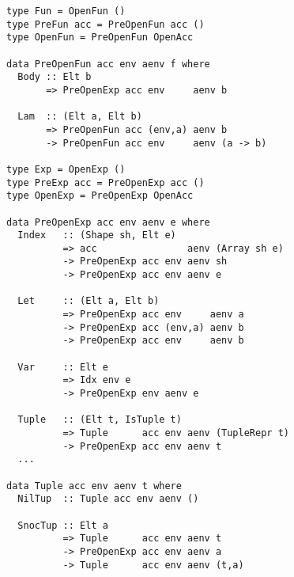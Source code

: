 \begin{lstlisting}[label=lst:exp-ast, caption={The first-order abstract syntax of the \texttt{Exp} level of Accelerate.}]
type Fun = OpenFun ()
type PreFun acc = PreOpenFun acc ()
type OpenFun = PreOpenFun OpenAcc

data PreOpenFun acc env aenv f where
  Body :: Elt b
       => PreOpenExp acc env     aenv b

  Lam  :: (Elt a, Elt b)
       => PreOpenFun acc (env,a) aenv b
       -> PreOpenFun acc env     aenv (a -> b)

type Exp = OpenExp ()
type PreExp acc = PreOpenExp acc ()
type OpenExp = PreOpenExp OpenAcc

data PreOpenExp acc env aenv e where
  Index   :: (Shape sh, Elt e)
          => acc                aenv (Array sh e)
          -> PreOpenExp acc env aenv sh
          -> PreOpenExp acc env aenv e

  Let     :: (Elt a, Elt b)
          => PreOpenExp acc env     aenv a
          -> PreOpenExp acc (env,a) aenv b
          -> PreOpenExp acc env     aenv b

  Var     :: Elt e
          => Idx env e
          -> PreOpenExp env aenv e

  Tuple   :: (Elt t, IsTuple t)
          => Tuple      acc env aenv (TupleRepr t)
          -> PreOpenExp acc env aenv t
  ...

data Tuple acc env aenv t where
  NilTup  :: Tuple acc env aenv ()

  SnocTup :: Elt a
          => Tuple      acc env aenv t
          -> PreOpenExp acc env aenv a
          -> Tuple      acc env aenv (t,a)
\end{lstlisting}
%




%


